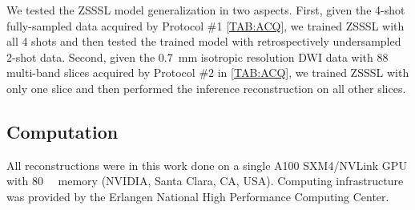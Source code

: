 \documentclass[journal,twoside,web]{ieeecolor}
\newcommand{\argmin}{\operatornamewithlimits{argmin}}
\newcommand{\norm}[1]{\left\lVert#1\right\rVert}
\begin{document}
	We tested the ZSSSL model generalization in two aspects.
	First, given the 4-shot fully-sampled data acquired by
	Protocol \#1 \cref{TAB:ACQ}, we trained ZSSSL with all 4 shots
	and then tested the trained model with retrospectively undersampled 2-shot data.
	Second, given the \SI{0.7}{\milli\meter} isotropic resolution DWI data
	with 88 multi-band slices acquired by Protocol \#2 in \cref{TAB:ACQ},
	we trained ZSSSL with only one slice and
	then performed the inference reconstruction on all other slices.



    \subsection{Computation}

    All reconstructions were in this work done on a single A100 SXM4/NVLink GPU
    with \SI{80}{\giga\byte} memory (NVIDIA, Santa Clara, CA, USA).
    Computing infrastructure was provided by
    the Erlangen National High Performance Computing Center.
\end{document}

